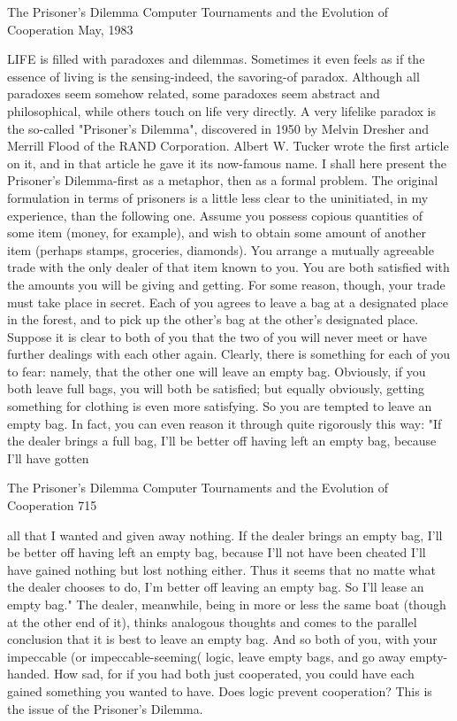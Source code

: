 
                           The Prisoner's Dilemma
                         Computer Tournaments and
                         the Evolution of Cooperation
                                         May, 1983

LIFE is filled with paradoxes and dilemmas. Sometimes it even feels as if the essence of
living is the sensing-indeed, the savoring-of paradox. Although all paradoxes seem
somehow related, some paradoxes seem abstract and philosophical, while others touch on
life very directly. A very lifelike paradox is the so-called "Prisoner's Dilemma",
discovered in 1950 by Melvin Dresher and Merrill Flood of the RAND Corporation.
Albert W. Tucker wrote the first article on it, and in that article he gave it its now-famous
name. I shall here present the Prisoner's Dilemma-first as a metaphor, then as a formal
problem.
The original formulation in terms of prisoners is a little less clear to the uninitiated, in my
experience, than the following one. Assume you possess copious quantities of some item
(money, for example), and wish to obtain some amount of another item (perhaps stamps,
groceries, diamonds). You arrange a mutually agreeable trade with the only dealer of that
item known to you. You are both satisfied with the amounts you will be giving and
getting. For some reason, though, your trade must take place in secret. Each of you agrees
to leave a bag at a designated place in the forest, and to pick up the other's bag at the
other's designated place. Suppose it is clear to both of you that the two of you will never
meet or have further dealings with each other again.
Clearly, there is something for each of you to fear: namely, that the other one will leave
an empty bag. Obviously, if you both leave full bags, you will both be satisfied; but
equally obviously, getting something for clothing is even more satisfying. So you are
tempted to leave an empty bag. In fact, you can even reason it through quite rigorously
this way: "If the dealer brings a full bag, I'll be better off having left an empty bag,
because I'll have gotten




The Prisoner's Dilemma Computer Tournaments and the Evolution of Cooperation              715

all that I wanted and given away nothing. If the dealer brings an empty bag, I'll be better
off having left an empty bag, because I'll not have been cheated I'll have gained nothing
but lost nothing either. Thus it seems that no matte what the dealer chooses to do, I'm
better off leaving an empty bag. So I'll lease an empty bag."
The dealer, meanwhile, being in more or less the same boat (though at the other end of
it), thinks analogous thoughts and comes to the parallel conclusion that it is best to leave
an empty bag. And so both of you, with your impeccable (or impeccable-seeming( logic,
leave empty bags, and go away empty-handed. How sad, for if you had both just
cooperated, you could have each gained something you wanted to have. Does logic
prevent cooperation? This is the issue of the Prisoner's Dilemma.

